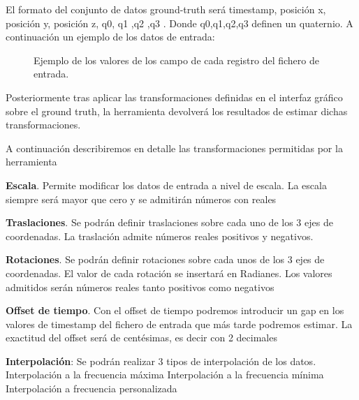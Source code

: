 El formato del conjunto de datos ground-truth será timestamp, posición x, posición y, posición z, q0, q1 ,q2 ,q3 . Donde q0,q1,q2,q3 definen un quaternio.
A continuación un ejemplo de los datos de entrada:
\begin{figure}[H]
\begin{center}
\hspace{0.5cm}
\end{center}
\caption{Ejemplo de los valores de los campo de cada registro del fichero de entrada. }
\end{figure}


Posteriormente tras aplicar las transformaciones definidas en el interfaz gráfico sobre el ground truth, la herramienta devolverá los resultados de estimar dichas transformaciones.


A continuación describiremos en detalle las transformaciones permitidas por la herramienta

\textbf{Escala}. Permite modificar los datos de entrada a nivel de escala. La escala siempre será mayor que cero y se admitirán números con reales

\textbf{Traslaciones}. Se podrán definir traslaciones sobre cada uno de los 3 ejes de coordenadas. 
La traslación admite números reales positivos y negativos.

\textbf{Rotaciones}. Se podrán definir rotaciones sobre cada unos de los 3 ejes de coordenadas. El valor de cada rotación se insertará en Radianes. Los valores admitidos serán números reales tanto positivos como negativos

\textbf{Offset de tiempo}. Con el offset de tiempo podremos introducir un gap en los valores de timestamp del fichero de entrada que más tarde podremos estimar. La exactitud del offset será de centésimas, es decir con 2 decimales

\textbf{Interpolación}: Se podrán realizar 3 tipos de interpolación de los datos.
	Interpolación a la frecuencia máxima
	Interpolación a la frecuencia mínima
	Interpolación a frecuencia personalizada


